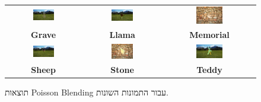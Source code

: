 \documentclass[a4paper,12pt]{article}
\begin{document}
\begin{figure}[H]
\begin{tabular}{ccc}
        \includegraphics[width=0.3\textwidth]{my_reasults/PS_res/grave_result.png} & 
        \includegraphics[width=0.3\textwidth]{my_reasults/PS_res/llama_result.png} & 
        \includegraphics[width=0.3\textwidth]{my_reasults/PS_res/memorial_result.png} \\
        \textbf{Grave} & \textbf{Llama} & \textbf{Memorial} \\
        \includegraphics[width=0.3\textwidth]{my_reasults/PS_res/sheep_result.png} & 
        \includegraphics[width=0.3\textwidth]{my_reasults/PS_res/stone_result.png} & 
        \includegraphics[width=0.3\textwidth]{my_reasults/PS_res/teddy_result.png} \\
        \textbf{Sheep} & \textbf{Stone} & \textbf{Teddy} \\
    \end{tabular}
    \caption{תוצאות Poisson Blending עבור התמונות השונות.}
    \label{fig:ps_results}
\end{figure}
\end{document}
